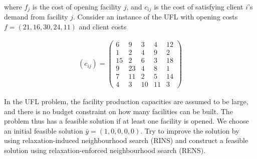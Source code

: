 \begin{itemize}
	where $f_j$ is the cost of opening facility $j$, and $c_{ij}$ is the cost of satisfying client $i$'s demand from facility $j$. Consider an instance of the UFL with opening costs $f=(21,16,30,24,11)$ and client costs

	\begin{align*}
	 (c_{ij}) = \left(
		\begin{array}{ccccc}
			6  & 9  & 3 & 4  & 12 \\
			1  & 2  & 4 & 9  & 2  \\
			15 & 2  & 6 & 3  & 18 \\
			9  & 23 & 4 & 8  & 1  \\
			7  & 11 & 2 & 5  & 14 \\
			4  & 3  & 10& 11 & 3
		\end{array}
	 \right)
	\end{align*}

	In the UFL problem, the facility production capacities are assumed to be large, and there is no budget constraint on how many facilities can be built. The problem thus has a feasible solution if at least one facility is opened. We choose an initial feasible solution $\bar{y} = (1,0,0,0,0)$. Try to improve the solution by using relaxation-induced neighbourhood search (RINS) and construct a feasible solution using relaxation-enforced neighbourhood search (RENS). 
\end{itemize}
